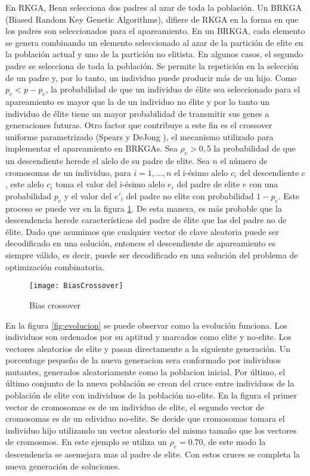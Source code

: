 En RKGA, Bean \cite{Bean} selecciona dos padres al azar de toda la población. Un BRKGA (Biased Random Key Genetic Algorithms), difiere de RKGA en la forma en que los padres son seleccionados para el apareamiento. En un BRKGA, cada elemento se genera combinando un elemento seleccionado al azar de la partición de elite en la población actual y uno de la partición no elitista. En algunos casos, el segundo padre se selecciona de toda la población. Se permite la repetición en la selección de un padre y, por lo tanto, un individuo puede producir más de un hijo. Como $p_e < p - p_e$, la probabilidad de que un individuo de élite sea seleccionado para el apareamiento es mayor que la de un individuo no élite y por lo tanto un individuo de élite tiene un mayor probabilidad de transmitir sus genes a generaciones futuras. Otro factor que contribuye a este fin es el crossover uniforme parametrizado (Spears y DeJong \cite{SpearsDeJong}), el mecanismo utilizado para implementar el apareamiento en BRKGAs. Sea $\rho_e > 0,5$ la probabilidad de que un descendiente herede el alelo de su padre de elite. Sea $n$ el número de cromosomas de un individuo, para $i =1,...,n$ el i-ésimo alelo $c_i$ del descendiente $c$, este alelo $c_i$ toma el valor del i-ésimo alelo $e_i$ del padre de elite $e$ con una probabilidad $p_e$ y el valor del $e'_i$ del padre no elite con probabilidad $1-p_e$. Este proceso se puede ver en la figura \ref{fig:biasCrossover}. De esta manera, es más probable que la descendencia herede características del padre de élite que las del padre no de élite. Dado que asumimos que cualquier vector de clave aleatoria puede ser decodificado en una solución, entonces el descendiente de apareamiento es siempre válido, es decir, puede ser decodificado en una solución del problema de optimización combinatoria.

\begin{figure}[h]
	\caption{Bias crossover}
	\centering
	\texttt{[image: BiasCrossover]}
	\label{fig:biasCrossover}
\end{figure}

\bigskip

En la figura \ref{fig:evolucion} se puede observar como la evolución funciona. Los individuos son ordenados por su aptitud y marcados como elite y no-elite. Los vectores aleatorios de elite y pasan directamente a la siguiente generación. Un porcentage pequeño de la nueva generacion sera conformado por individuos mutantes, generados aleatoriamente como la poblacion inicial. Por último, el último conjunto de la nueva población se crean del cruce entre individuos de la población de elite con individuos de la población no-elite. En la figura el primer vector de cromosomas es de un individuo de elite, el segundo vector de cromosomas es de un edividuo no-elite. Se decide que cromosomas tomara el individuo hijo utilizando un vector aleatorio del mismo tamaño que los vectores de cromosmos. En este ejemplo se utiliza un $\rho_e = 0.70$, de este modo la descendencia se asemejara mas al padre de elite. Con estos cruces se completa la nueva generación de soluciones.

